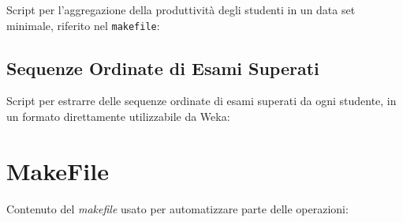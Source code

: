 \begin{appendices}
            Script per l'aggregazione della produttività degli studenti in un data set minimale, riferito nel \texttt{makefile}:
            

        \subsection{Sequenze Ordinate di Esami Superati}
        \label{appendix:seq}

            Script per estrarre delle sequenze ordinate di esami superati da ogni studente, in un formato direttamente utilizzabile da Weka:
            

    \section{MakeFile}
    \label{appendix:makefile}

        Contenuto del \textit{makefile} usato per automatizzare parte delle operazioni:


\end{appendices}

